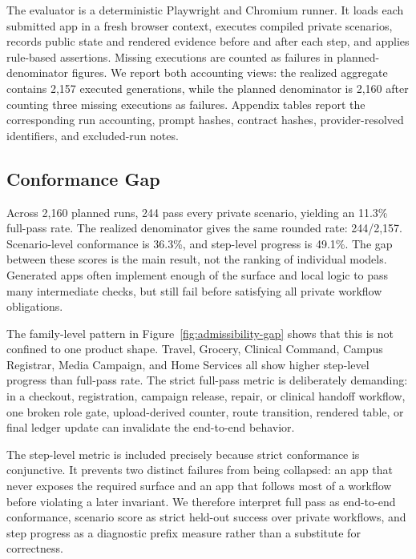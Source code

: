 The evaluator is a deterministic Playwright and Chromium runner. It loads each
submitted app in a fresh browser context, executes compiled private scenarios,
records public state and rendered evidence before and after each step, and
applies rule-based assertions. Missing executions are counted as failures in
planned-denominator figures. We report both accounting views: the realized
aggregate contains 2,157 executed generations, while the planned denominator is
2,160 after counting three missing executions as failures. Appendix tables
report the corresponding run accounting, prompt hashes, contract hashes,
provider-resolved identifiers, and excluded-run notes.

\subsection{Conformance Gap}
\label{sec:results-gap}

Across 2,160 planned runs, 244 pass every private scenario, yielding an 11.3\%
full-pass rate. The realized denominator gives the same rounded rate:
244/2,157. Scenario-level conformance is 36.3\%, and step-level progress is
49.1\%. The gap between these scores is the main result, not the ranking of
individual models. Generated apps often implement enough of the surface and
local logic to pass many intermediate checks, but still fail before satisfying
all private workflow obligations.

The family-level pattern in Figure~\ref{fig:admissibility-gap} shows that this
is not confined to one product shape. Travel, Grocery, Clinical Command,
Campus Registrar, Media Campaign, and Home Services all show higher
step-level progress than full-pass rate. The strict full-pass metric is
deliberately demanding: in a checkout, registration, campaign release, repair,
or clinical handoff workflow, one broken role gate, upload-derived counter,
route transition, rendered table, or final ledger update can invalidate the
end-to-end behavior.

The step-level metric is included precisely because strict conformance is
conjunctive. It prevents two distinct failures from being collapsed: an app
that never exposes the required surface and an app that follows most of a
workflow before violating a later invariant. We therefore interpret full pass
as end-to-end conformance, scenario score as strict held-out success over
private workflows, and step progress as a diagnostic prefix measure rather
than a substitute for correctness.

